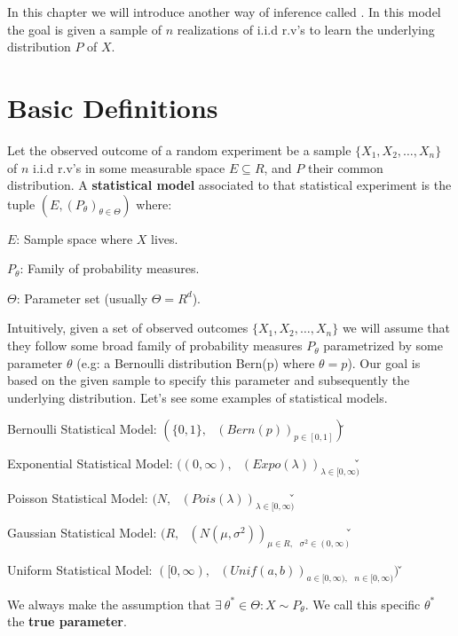 In this chapter we will introduce another way of inference called . In this model the goal
is given a sample of $n$ realizations of i.i.d r.v's to learn the underlying distribution $P$ of $X$.

\section{Basic Definitions}


Let the observed outcome of a random experiment be a sample $\{ X_{1}, X_{2}, \ldots, X_{n} \}$ of $n$ i.i.d r.v's in
some measurable space $E \subseteq R$, and $P$ their common distribution. A \textbf{statistical model} associated to
that statistical experiment is the tuple $(E, (P_{\theta})_{\theta \in \Theta})$ where:
\bit
\item $E$: Sample space where $X$ lives.
\item $P_{\theta}$: Family of probability measures.
\item $\Theta$: Parameter set (usually $\Theta = R^d$).
\eit
\ed

Intuitively, given a set of observed outcomes $\{ X_{1}, X_{2}, \ldots, X_{n} \}$ we will assume that they follow
some broad family of probability measures $P_{\theta}$ parametrized by some parameter $\theta$ (e.g: a Bernoulli
distribution Bern(p) where $\theta = p$). Our goal is based on the given sample to specify this parameter and
subsequently the underlying distribution. \v

Let's see some examples of statistical models.
\bit
\item Bernoulli Statistical Model: $( \{ 0,1 \}, \:\:\: (Bern(p))_{ {p} \in [0,1]})$\v
\item Exponential Statistical Model: $( (0,\infty), \:\:\: (Expo(\lambda))_{\lambda \in [0,\infty)}$\v
\item Poisson Statistical Model: $( N, \:\:\: (Pois(\lambda))_{ \lambda \in [0,\infty)}$\v
\item Gaussian Statistical Model: $( R, \:\:\: (N(\mu, \sigma^2))_{\mu \in R, \:\:\: \sigma^2 \in (0,\infty) }$\v
\item Uniform Statistical Model: $( [0, \infty), \:\:\: (Unif(a,b))_{a \in [0,\infty), \:\:\: n \in [0,\infty)})$ \v
\eit

We always make the assumption that $\exists \: \theta^{*} \in \Theta : X \sim P_{\theta}$. We call this specific
$\theta^{*}$ the \textbf{true parameter}.
\ed

